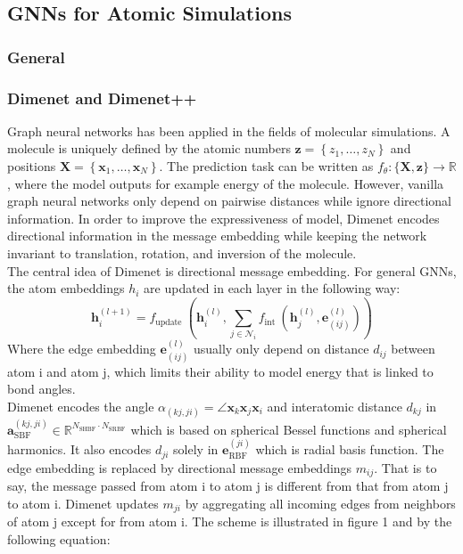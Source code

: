 \subsection{GNNs for Atomic Simulations}
\label{subsec:atomic-simulations}
\subsubsection{General}
\subsubsection{Dimenet and Dimenet++}
Graph neural networks has been applied in the fields of molecular simulations. A molecule is uniquely defined by the atomic numbers $\boldsymbol{z}=\left\{z_{1}, \ldots, z_{N}\right\}$ and positions $ \boldsymbol{X}=\left\{\boldsymbol{x}_{1}, \ldots, \boldsymbol{x}_{N}\right\}$. The prediction task can be written as $f_{\theta}:\{\boldsymbol{X}, \boldsymbol{z}\} \rightarrow \mathbb{R}$, where the model outputs for example energy of the molecule. However, vanilla graph neural networks only depend on pairwise distances while ignore directional information. In order to improve the expressiveness of model, Dimenet\cite*{DBLP:journals/corr/abs-2003-03123} encodes directional information in the message embedding while keeping the network invariant to translation, rotation, and inversion of the molecule\cite*{DBLP:journals/corr/abs-2003-03123}.\\
The central idea of Dimenet is directional message embedding. For general GNNs, the atom embeddings $h_i$ are updated in each layer in the following way:\\
\begin{equation}
    \boldsymbol{h}_{i}^{(l+1)}=f_{\text {update }}\left(\boldsymbol{h}_{i}^{(l)}, \sum_{j \in \mathcal{N}_{i}} f_{\text {int }}\left(\boldsymbol{h}_{j}^{(l)}, \boldsymbol{e}_{(i j)}^{(l)}\right)\right)
\end{equation}
Where the edge embedding $\boldsymbol{e}_{(i j)}^{(l)}$ usually only depend on distance $d_{ij}$ between atom i and atom j, which limits their ability to model energy that is linked to bond angles.\\
Dimenet encodes the angle $\alpha_{(k j, j i)}=\angle \boldsymbol{x}_{k} \boldsymbol{x}_{j} \boldsymbol{x}_{i}$ and interatomic distance $d_{kj}$ in $\boldsymbol{a}_{\mathrm{SBF}}^{(k j, j i)} \in \mathbb{R}^{N_{\mathrm{SHBF}} \cdot N_{\mathrm{SRBF}}}$ which is based
on spherical Bessel functions and spherical harmonics. It also encodes $d_{ji}$ solely in $\boldsymbol{e}_{\mathrm{RBF}}^{(j i)}$ which is radial basis function.  The edge embedding is replaced by directional message embeddings $m_{ij}$. That is to say, the message passed from atom i to atom j is different from that from atom j to atom i. Dimenet updates $m_{ji}$ by aggregating all incoming edges from neighbors of atom j except for from atom i. The scheme is illustrated in figure 1 and by the following equation:
